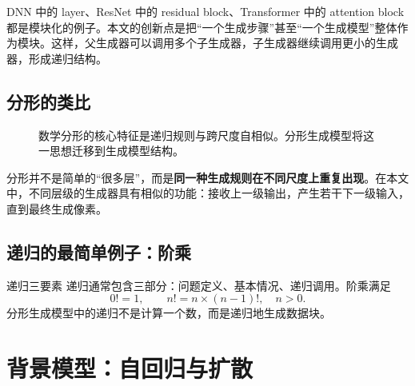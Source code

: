 \documentclass[UTF8,11pt,a4paper]{ctexart}
\newcommand{\term}[1]{\textbf{\textcolor{mainblue}{#1}}}
\newcommand{\x}{\bm{x}}
\begin{document}
DNN 中的 layer、ResNet 中的 residual block、Transformer 中的 attention block 都是模块化的例子。本文的创新点是把“一个生成步骤”甚至“一个生成模型”整体作为模块。这样，父生成器可以调用多个子生成器，子生成器继续调用更小的生成器，形成递归结构。

\subsection{分形的类比}

\begin{figure}[H]
\centering
{}
\caption{数学分形的核心特征是递归规则与跨尺度自相似。分形生成模型将这一思想迁移到生成模型结构。}
\end{figure}

分形并不是简单的“很多层”，而是\term{同一种生成规则在不同尺度上重复出现}。在本文中，不同层级的生成器具有相似的功能：接收上一级输出，产生若干下一级输入，直到最终生成像素。

\subsection{递归的最简单例子：阶乘}

\begin{notebox}{递归三要素}
递归通常包含三部分：问题定义、基本情况、递归调用。阶乘满足
\begin{equation}
0!=1,\qquad n!=n\times(n-1)!,\quad n>0.
\end{equation}
分形生成模型中的递归不是计算一个数，而是递归地生成数据块。
\end{notebox}

\section{背景模型：自回归与扩散}
\end{document}
